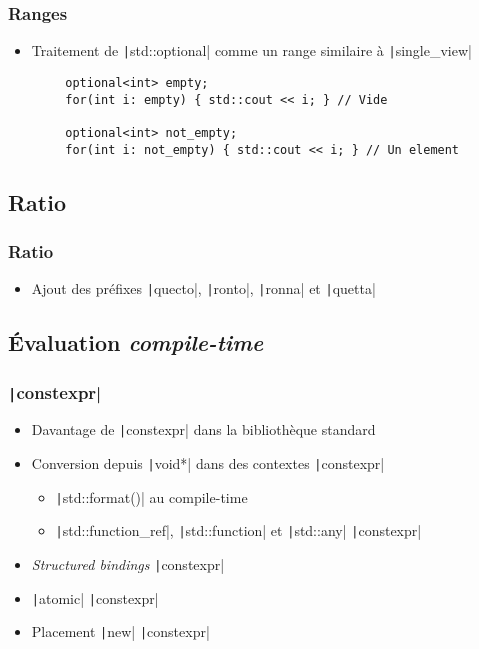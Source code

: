 \documentclass[C++.tex]{subfiles}
\begin{document}
\begin{frame}[fragile]
	\frametitle{Ranges}
	\begin{itemize}
		\item Traitement de \texttt|std::optional| comme un range similaire à \texttt|single_view|
	\end{itemize}

	\begin{verbatim}
		optional<int> empty;
		for(int i: empty) { std::cout << i; } // Vide

		optional<int> not_empty;
		for(int i: not_empty) { std::cout << i; } // Un element
	\end{verbatim}

\end{frame}

\subsection*{Ratio}
\begin{frame}[fragile]
	\frametitle{Ratio}
	\begin{itemize}
		\item Ajout des préfixes \texttt|quecto|, \texttt|ronto|, \texttt|ronna| et \texttt|quetta|
	\end{itemize}

\end{frame}

\subsection*{Évaluation \textit{compile-time}}
\begin{frame}[fragile]
	\frametitle{\texttt|constexpr|}
	\begin{itemize}
		\item Davantage de \texttt|constexpr| dans la bibliothèque standard
		\item Conversion depuis \texttt|void*| dans des contextes \texttt|constexpr|
		\begin{itemize}
			\item \texttt|std::format()| au compile-time
			\item \texttt|std::function_ref|, \texttt|std::function| et \texttt|std::any| \texttt|constexpr|
		\end{itemize}
		\item \textit{Structured bindings} \texttt|constexpr|
		\item \texttt|atomic| \texttt|constexpr|
		\item Placement \texttt|new| \texttt|constexpr|
	\end{itemize}

\end{frame}
\end{document}
